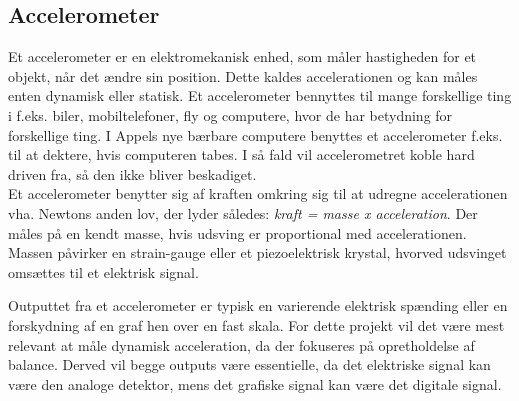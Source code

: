 \subsection{Accelerometer}\label{Accafsnit}
Et accelerometer er en elektromekanisk enhed, som måler hastigheden for et objekt, når det ændre sin position. Dette kaldes accelerationen og kan måles enten dynamisk eller statisk. Et accelerometer bennyttes til mange forskellige ting i f.eks. biler, mobiltelefoner, fly og computere, hvor de har betydning for forskellige ting. I Appels nye bærbare computere benyttes et accelerometer f.eks. til at dektere, hvis computeren tabes. I så fald vil accelerometret koble hard driven fra, så den ikke bliver beskadiget. \cite{Inc.2015,Academic2015c}\\
Et accelerometer benytter sig af kraften omkring sig til at udregne accelerationen vha. Newtons anden lov, der lyder således: \textit{kraft = masse x acceleration}. Der måles på en kendt masse, hvis udsving er proportional med accelerationen. Massen påvirker en strain-gauge eller et piezoelektrisk krystal, hvorved udsvinget omsættes til et elektrisk signal. \cite{Academic2015c,Krag2015} 

Outputtet fra et accelerometer er typisk en varierende elektrisk spænding eller en forskydning af en graf hen over en fast skala. For dette projekt vil det være mest relevant at måle dynamisk acceleration, da der fokuseres på opretholdelse af balance. Derved vil begge outputs være essentielle, da det elektriske signal kan være den analoge detektor, mens det grafiske signal kan være det digitale signal. \cite{Academic2015c}

